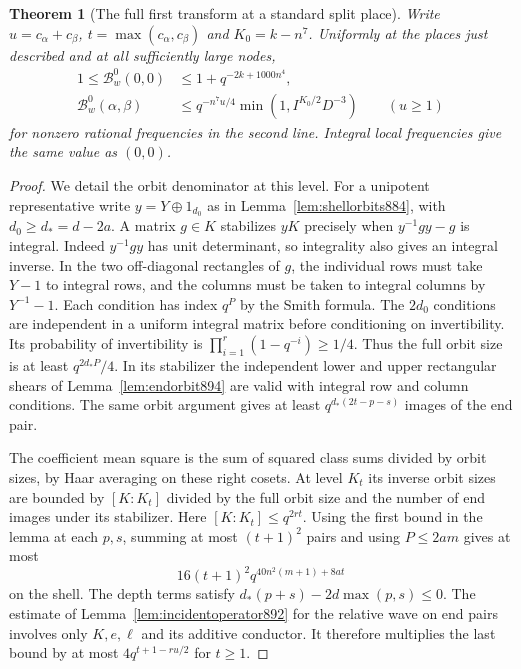 \documentclass[a4paper,11pt]{article}
\newtheorem{theorem}[proposition]{Theorem}
\theoremstyle{definition}
\theoremstyle{remark}
\numberwithin{equation}{section}
\begin{document}
\begin{theorem}[The full first transform at a standard split place]
\leavevmode\label{thm:standardfirst899}
Write \(u=c_\alpha+c_\beta\), \(t=\max(c_\alpha,c_\beta)\) and
\(K_0=k-n^7\). Uniformly at the places just described and at all
sufficiently large nodes,
\[
 \begin{aligned}
 1\le\mathcal B^0_w(0,0)&\le1+q^{-2k+1000n^4},\\
 \mathcal B^0_w(\alpha,\beta)&\le
 q^{-n^7u/4}\min(1,I^{K_0/2}D^{-3})\qquad(u\ge1)
 \end{aligned}
\]
for nonzero rational frequencies in the second line. Integral
local frequencies give the same value as \((0,0)\).
\end{theorem}
\begin{proof}
We detail the orbit denominator at this level. For a unipotent
representative write \(y=Y\oplus1_{d_0}\) as in
Lemma~\ref{lem:shellorbits884}, with \(d_0\ge d_*=d-2a\).
A matrix \(g\in K\) stabilizes \(yK\) precisely when
\(y^{-1}gy-g\) is integral. Indeed \(y^{-1}gy\) has unit
determinant, so integrality also gives an integral inverse.
In the two off-diagonal rectangles of \(g\), the individual
rows must take \(Y-1\) to integral rows, and the columns must
be taken to integral columns by \(Y^{-1}-1\).
Each condition has index \(q^P\) by the Smith formula. The
\(2d_0\) conditions are independent in a uniform integral matrix
before conditioning on invertibility. Its probability of
invertibility is \(\prod_{i=1}^r(1-q^{-i})\ge1/4\).
Thus the full orbit size is at least \(q^{2d_*P}/4\).
In its stabilizer the independent lower and upper rectangular
shears of Lemma~\ref{lem:endorbit894} are valid with integral
row and column conditions. The same orbit argument gives at
least \(q^{d_*(2t-p-s)}\) images of the end pair.

The coefficient mean square is the sum of squared class sums
divided by orbit sizes, by Haar averaging on these right cosets.
At level \(K_t\) its inverse orbit sizes are bounded by
\([K:K_t]\) divided by the full orbit size and the number of end
images under its stabilizer. Here \([K:K_t]\le q^{2rt}\).
Using the first bound in the lemma at each \(p,s\), summing at
most \((t+1)^2\) pairs and using \(P\le2am\) gives at most
\[
     16(t+1)^2 q^{40n^2(m+1)+8at}
\]
on the shell. The depth terms satisfy
\(d_*(p+s)-2d\max(p,s)\le0\).
The estimate of Lemma~\ref{lem:incidentoperator892} for the
relative wave on end pairs involves only \(K,e,\ell\) and its
additive conductor. It therefore multiplies the last bound by
at most \(4q^{t+1-ru/2}\) for \(t\ge1\).


\end{proof}
\end{document}
